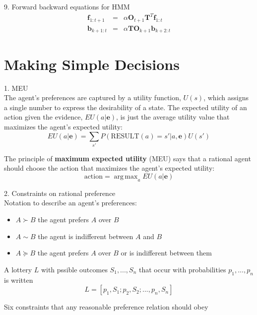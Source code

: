 \documentclass[12pt]{article}
\DeclareMathOperator*{\argmax}{arg\,max}
\begin{document}
9. Forward backward equations for HMM
\begin{eqnarray*}
\boldsymbol{f}_{1:t+1}
&=& \alpha \boldsymbol{O}_{t+1} \boldsymbol{T}^T \boldsymbol{f}_{1:t} \\
\boldsymbol{b}_{k+1:t}
&=& \alpha \boldsymbol{T} \boldsymbol{O}_{k+1} \boldsymbol{b}_{k+2:t}
\end{eqnarray*}

\section*{Making Simple Decisions}

1. MEU \\

The agent's preferences are captured by a utility function, $U(s)$, which assigns a single number to express the desirability of a state. The expected utility of an action given the evidence, $EU(a | \boldsymbol{e})$, is just the average utility value that maximizes the agent's expected utility:
\begin{equation*}
  EU(a | \boldsymbol{e}) 
  = \sum_{s'} P(\text{RESULT}(a) = s'|a,\boldsymbol{e})U(s')
\end{equation*}

The principle of {\bf maximum expected utility} (MEU) says that a rational agent should choose the action that maximizes the agent's expected utility:
\begin{equation*}
  \text{action} = \argmax_a EU(a|\boldsymbol{e})
\end{equation*}

2. Constraints on rational preference \\

Notation to describe an agent's preferences:
\begin{itemize}
  \item $A \succ B$ the agent prefers $A$ over $B$
  \item $A \sim B$ the agent is indifferent between $A$ and $B$
  \item $A \succcurlyeq B$ the agent prefers $A$ over $B$ or is indifferent between them
\end{itemize}

A lottery $L$ with pssible outcomes $S_1,...,S_n$ that occur with probabilities $p_1,...,p_n$ is written
\begin{equation*}
  L = [p_1, S_1; p_2, S_2; ..., p_n,S_n]
\end{equation*}

Six constraints that any reasonable preference relation should obey
\end{document}
